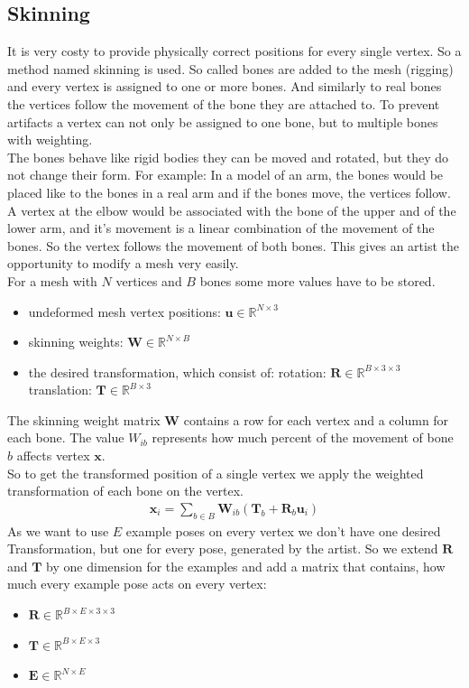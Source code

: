 \subsection{Skinning}
	It is very costy to provide physically correct positions for every single vertex. So a method named skinning is used. So called bones are added to the mesh (rigging) and every vertex is assigned to one or more bones. And similarly to real bones the vertices follow the movement of the bone they are attached to. To prevent artifacts a vertex can not only be assigned to one bone, but to multiple bones with weighting. \\
	The bones behave like rigid bodies they can be moved and rotated, but they do not change their form. For example: In a model of an arm, the bones would be placed like to the bones in a real arm and if the bones move, the vertices follow. A vertex at the elbow would be associated with the bone of the upper and of the lower arm, and it's movement is a linear combination of the movement of the bones. So the vertex follows the movement of both bones. This gives an artist the opportunity to modify a mesh very easily. \\
	For a mesh with $N$ vertices and $B$ bones some more values have to be stored.
\begin{itemize}
	\item undeformed mesh vertex positions: $\bm{u} \in \mathbb{R}^{N \times 3}$	
	\item skinning weights: $\bm{W} \in \mathbb{R} ^{N \times B}$
	\item the desired transformation, which consist of:
		\subitem rotation: $\bm{R} \in \mathbb{R}^{B\times 3\times 3}$
		\subitem translation: $\bm{T}\in \mathbb{R}^{B\times 3}$
\end{itemize}
	The skinning weight matrix $\bm{W}$ contains a row for each vertex and a column for each bone. The value $W_{ib}$ represents how much percent of the movement of bone $b$ affects vertex $\bm x$.\\
	So to get the transformed position of a single vertex we apply the weighted transformation of each bone on the vertex.
\begin{align}
\bm{x}_i =\sum_{b\in B} \bm{W}_{ib}\left(\bm{T}_b +\bm{R}_b \bm{u}_i\right)
\end{align}
As we want to use $E$ example poses on every vertex we don't have one desired Transformation, but one for every pose, generated by the artist. So we extend $\bm{R}$ and $\bm{T}$ by one dimension for the examples and add a matrix that contains, how much every example pose acts on every vertex:
\begin{itemize}
	\item $\bm {R}\in\mathbb{R}^{B\times E\times 3\times 3}$
	\item $\bm {T}\in \mathbb{R}^{B\times E\times 3}$
	\item $\bm{E}\in \mathbb{R}^{N \times E}$
\end{itemize}

